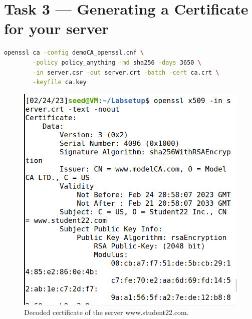 \section{Task 3 --- Generating a Certificate for your server}
%
\begin{lstlisting}[language=bash, caption=A command generating the
    certificate for the server]
    openssl ca -config demoCA_openssl.cnf \
        -policy policy_anything -md sha256 -days 3650 \
        -in server.csr -out server.crt -batch -cert ca.crt \
        -keyfile ca.key
\end{lstlisting}

\begin{figure}
    \centering
    \includegraphics[height=\textheight,width=\textwidth,keepaspectratio]
    {figures/server_crt.png}
    \caption{Decoded certificate of the server {\selectfont
    www.student22.com}.}\label{fig:server_crt}
\end{figure}

